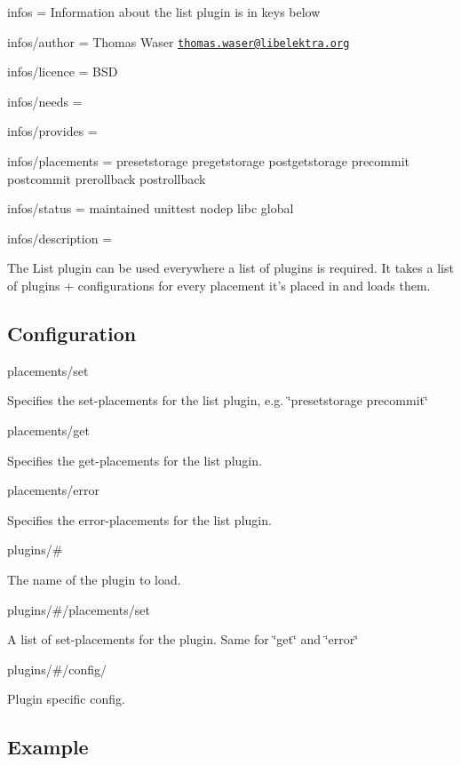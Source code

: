 
\begin{DoxyItemize}
\item infos = Information about the list plugin is in keys below
\item infos/author = Thomas Waser \href{mailto:thomas.waser@libelektra.org}{\tt thomas.\+waser@libelektra.\+org}
\item infos/licence = B\+S\+D
\item infos/needs =
\item infos/provides =
\item infos/placements = presetstorage pregetstorage postgetstorage precommit postcommit prerollback postrollback
\item infos/status = maintained unittest nodep libc global
\item infos/description =
\end{DoxyItemize}

The List plugin can be used everywhere a list of plugins is required. It takes a list of plugins + configurations for every placement it's placed in and loads them.

\subsection*{Configuration}

{\ttfamily placements/set}

Specifies the set-\/placements for the list plugin, e.\+g. \char`\"{}presetstorage precommit\char`\"{}

{\ttfamily placements/get}

Specifies the get-\/placements for the list plugin.

{\ttfamily placements/error}

Specifies the error-\/placements for the list plugin.

{\ttfamily plugins/\#}

The name of the plugin to load.

{\ttfamily plugins/\#/placements/set}

A list of set-\/placements for the plugin. Same for \char`\"{}get\char`\"{} and \char`\"{}error\char`\"{}

{\ttfamily plugins/\#/config/}

Plugin specific config.

\subsection*{Example}

